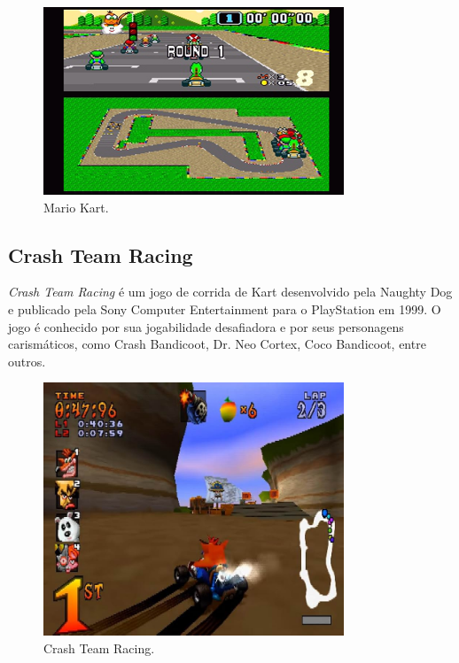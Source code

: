 \begin{figure}[H]
    \centering
    \includegraphics[width=0.8\textwidth]{figuras/Mario Kart.png}
    \caption{Mario Kart. \cite{marioKart}}
    \label{fig:mario-kart}
\end{figure}

\subsection{Crash Team Racing}

\textit{Crash Team Racing} é um jogo de corrida de Kart desenvolvido pela Naughty Dog e publicado pela Sony Computer Entertainment para o PlayStation em 1999. O jogo é conhecido por sua jogabilidade desafiadora e por seus personagens carismáticos, como Crash Bandicoot, Dr. Neo Cortex, Coco Bandicoot, entre outros.

\begin{figure}[H]
    \centering
    \includegraphics[width=0.8\textwidth]{figuras/Crash Team Racing.jpg}
    \caption{Crash Team Racing. \cite{crashTeamRacing}}
    \label{fig:crash-team-racing}
\end{figure}


